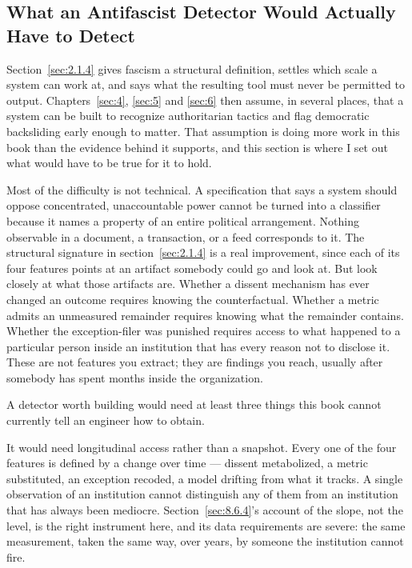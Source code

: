 \subsection{What an Antifascist Detector Would Actually Have to Detect}
\label{sec:9.1.6}
Section~\ref{sec:2.1.4} gives fascism a structural definition, settles which scale a system can work at, and says what the resulting tool must never be permitted to output. Chapters~\ref{sec:4}, \ref{sec:5} and \ref{sec:6} then assume, in several places, that a system can be built to recognize authoritarian tactics and flag democratic backsliding early enough to matter. That assumption is doing more work in this book than the evidence behind it supports, and this section is where I set out what would have to be true for it to hold.

Most of the difficulty is not technical. A specification that says a system should oppose concentrated, unaccountable power cannot be turned into a classifier because it names a property of an entire political arrangement. Nothing observable in a document, a transaction, or a feed corresponds to it. The structural signature in section~\ref{sec:2.1.4} is a real improvement, since each of its four features points at an artifact somebody could go and look at. But look closely at what those artifacts are. Whether a dissent mechanism has ever changed an outcome requires knowing the counterfactual. Whether a metric admits an unmeasured remainder requires knowing what the remainder contains. Whether the exception-filer was punished requires access to what happened to a particular person inside an institution that has every reason not to disclose it. These are not features you extract; they are findings you reach, usually after somebody has spent months inside the organization.

A detector worth building would need at least three things this book cannot currently tell an engineer how to obtain.

It would need longitudinal access rather than a snapshot. Every one of the four features is defined by a change over time — dissent metabolized, a metric substituted, an exception recoded, a model drifting from what it tracks. A single observation of an institution cannot distinguish any of them from an institution that has always been mediocre. Section~\ref{sec:8.6.4}'s account of the slope, not the level, is the right instrument here, and its data requirements are severe: the same measurement, taken the same way, over years, by someone the institution cannot fire.

